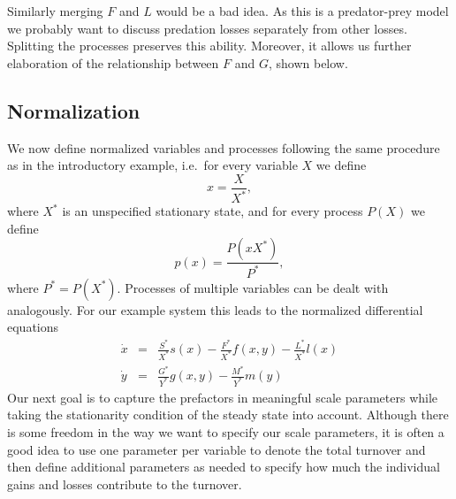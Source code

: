\documentclass{article}
\newcommand{\eq}[1]{\begin{equation}#1\end{equation}}
\newcommand{\eqa}[1]{\begin{eqnarray}#1\end{eqnarray}}
\begin{document}
Similarly merging $F$ and $L$ would be a bad idea. As this is a predator-prey model we probably want to discuss predation losses separately from other losses. Splitting the processes preserves this ability. Moreover, it allows us further elaboration of the relationship between $F$ and $G$, shown below.

\subsection{Normalization}
We now define normalized variables and processes following the same procedure as in the introductory example, i.e.~for every variable $X$ we define 
\eq{
x=\frac{X}{X^*},
}
where $X^*$ is an unspecified stationary state, and for every process $P(X)$ we define
\eq{
p(x)=\frac{P(xX^*)}{P^*},
}
where $P^*=P(X^*)$. Processes of multiple variables can be dealt with analogously. For our example system this leads to the normalized differential equations 
\eqa{
\dot{x}&=&\frac{S^*}{X^*}s(x)-\frac{F^*}{X^*}f(x,y)-\frac{L^*}{X^*}l(x)\\
\dot{y}&=&\frac{G^*}{Y^*}g(x,y)-\frac{M^*}{Y^*}m(y)
}
Our next goal is to capture the prefactors in meaningful scale parameters while taking the stationarity condition of the steady state into account. Although there is some freedom in the way we want to specify our scale parameters, it is often a good idea to use one parameter per variable to denote the total turnover and then define additional parameters as needed to specify how much the individual gains and losses contribute to the turnover. 
\end{document}
